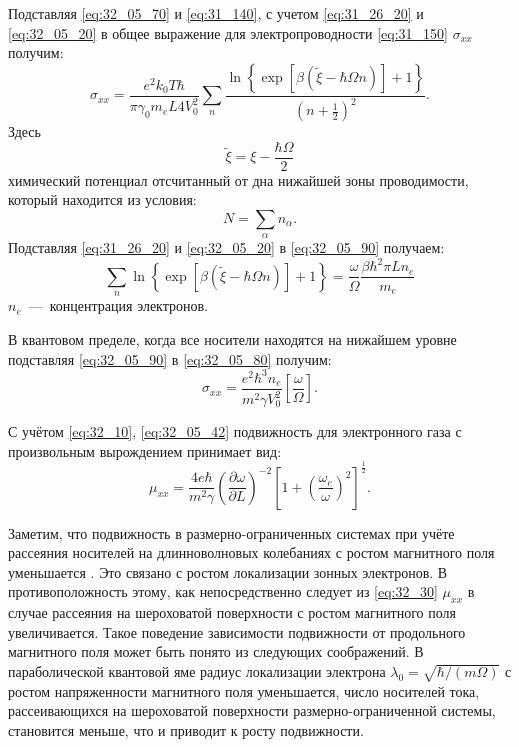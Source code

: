 Подставляя \eqref{eq:32_05_70} и \eqref{eq:31_140}, с учетом \eqref{eq:31_26_20} и \eqref{eq:32_05_20} в общее выражение для электропроводности \eqref{eq:31_150} $\sigma_{xx}$ получим:
\begin{equation} \label{eq:32_05_80}
\sigma_{xx} = \frac{e^2 k_0 T \hbar}{\pi \gamma_0 m_e L 4V^2_0} \sum_n{\frac{\ln{\left\{\exp{\left[\beta \left(\widetilde{\xi}-\hbar \Omega n\right)\right]}+1\right\}}}{{\left(n+\frac{1}{2}\right)}^2}}. 
\end{equation}
Здесь
\[
\widetilde{\xi} = \xi -\frac{\hbar\Omega }{2}
\]
химический потенциал отсчитанный от дна нижайшей зоны проводимости, который находится из условия:
\begin{equation} \label{eq:32_05_90}
N=\sum_{\alpha }{n_{\alpha}}.
\end{equation}
Подставляя \eqref{eq:31_26_20} и \eqref{eq:32_05_20} в \eqref{eq:32_05_90} получаем:
\begin{equation} \label{eq:32_05_100}
\sum_n{\ln{\left\{\exp{\left[\beta \left(\widetilde{\xi}-\hbar \Omega n\right)\right]}+1\right\}}}=\frac{\omega }{\Omega } \frac{\beta \hbar^2 \pi L n_e}{m_e}
\end{equation}
$n_e$~---~концентрация электронов.

В квантовом пределе, когда все носители находятся на нижайшем уровне подставляя \eqref{eq:32_05_90} в \eqref{eq:32_05_80} получим:
\begin{equation} \label{eq:32_10}
\sigma_{xx} =\frac{e^2 \hbar^3 n_e}{m^2 \gamma V_0^2 } \left[\frac{\omega }{\Omega } \right].
\end{equation}

С учётом \eqref{eq:32_10}, \eqref{eq:32_05_42} подвижность для электронного газа с произвольным вырождением принимает вид:
\begin{equation} \label{eq:32_30}
\mu _{xx} =\frac{4e\hbar }{m^{2} \gamma } \left(\frac{\partial \omega }{\partial L} \right)^{-2} \left[1+\left(\frac{\omega_c}{\omega } \right)^2 \right]^{\frac{1}{2} }.
\end{equation}

Заметим, что подвижность в размерно-ограниченных системах при учёте рассеяния носителей на длинноволновых колебаниях с ростом магнитного поля уменьшается \cite{Sinyavskii1998}. Это связано с ростом локализации зонных электронов. В противоположность этому, как непосредственно следует из \eqref{eq:32_30} $\mu_{xx} $ в случае рассеяния на шероховатой поверхности с ростом магнитного поля увеличивается. Такое поведение зависимости подвижности от продольного магнитного поля может быть понято из следующих соображений. В параболической квантовой яме радиус локализации электрона $\lambda_0 =\sqrt{\hbar / (m\Omega) } $ с ростом напряженности магнитного поля уменьшается, число носителей тока, рассеивающихся на шероховатой поверхности размерно-ограниченной системы, становится меньше, что и приводит к росту подвижности.

